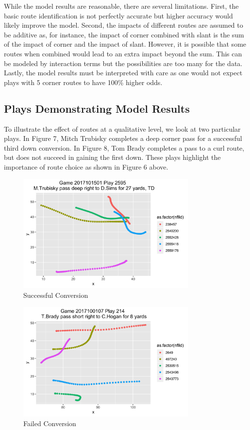 \documentclass[12pt,letterpaper]{article}
\begin{document}
While the model results are reasonable, there are several limitations. First, the basic route identification is not perfectly accurate but higher accuracy would likely improve the model. Second, the impacts of different routes are assumed to be additive as, for instance, the impact of corner combined with slant is the sum of the impact of corner and the impact of slant. However, it is possible that some routes when combined would lead to an extra impact beyond the sum. This can be modeled by interaction terms but the possibilities are too many for the data. Lastly, the model results must be interpreted with care as one would not expect plays with 5 corner routes to have 100\% higher odds.

\subsection*{Plays Demonstrating Model Results}

To illustrate the effect of routes at a qualitative level, we look at two particular plays. In Figure 7, Mitch Trubisky completes a deep corner pass for a successful third down conversion. In Figure 8, Tom Brady completes a pass to a curl route, but does not succeed in gaining the first down. These plays highlight the importance of route choice as shown in Figure 6 above. 


\begin{figure}[h!]
\centering
\includegraphics[width=0.8\textwidth]{good_post.png}
\caption{Successful Conversion}
\end{figure}


\begin{figure}[h!]
\centering
\includegraphics[width=0.8\textwidth]{bad_curl.png}
\caption{Failed Conversion}
\end{figure}
\end{document}
